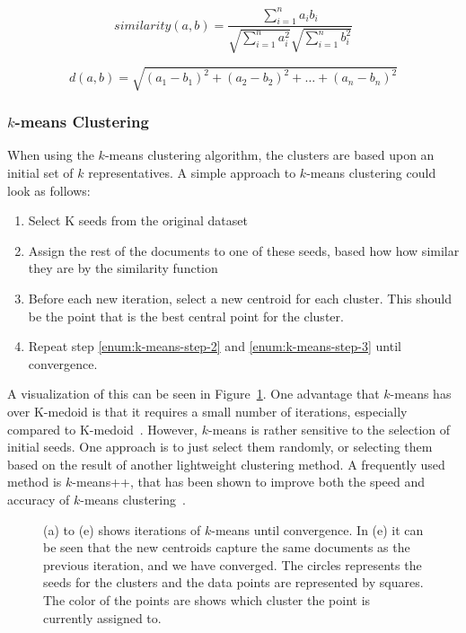 \begin{equation}\label{eq:cosine}
    similarity(a, b) = \frac{\sum_{i=1}^n a_i b_i}{\sqrt{\sum_{i=1}^n a_i^2}\sqrt{\sum_{i=1}^n b_i^2}}
\end{equation}

\begin{equation}\label{eq:euclidean}
    d(a, b) = \sqrt{(a_1 - b_1)^2 + (a_2 - b_2)^2 + \hdots + (a_n - b_n)^2}
\end{equation}

\subsubsection{$k$-means Clustering}\label{sec:k-mean}

When using the $k$-means clustering algorithm, the clusters are based upon an initial set of $k$ representatives.
A simple approach to $k$-means clustering could look as follows:

\begin{enumerate}
    \item Select K seeds from the original dataset
    \item \label{enum:k-means-step-2} Assign the rest of the documents to one of these seeds, based how how similar they are by the similarity function
    \item \label{enum:k-means-step-3} Before each new iteration, select a new centroid for each cluster. This should be the point that is the best central point for the cluster.
    \item Repeat step \ref{enum:k-means-step-2} and \ref{enum:k-means-step-3} until convergence.
\end{enumerate}

A visualization of this can be seen in Figure~\ref{fig:kmeans-iterations}.
One advantage that $k$-means has over K-medoid is that it requires a small number of iterations, especially compared to K-medoid~\cite{aggarwal2012survey, schutze1997projections}.
However, $k$-means is rather sensitive to the selection of initial seeds.
One approach is to just select them randomly, or selecting them based on the result of another lightweight clustering method.
A frequently used method is $k$-means++, that has been shown to improve both the speed and accuracy of $k$-means clustering~\cite{arthur2007k}.

\begin{figure}
    \centering
    \quad
    \caption{(a) to (e) shows iterations of $k$-means until convergence.
        In (e) it can be seen that the new centroids capture the same documents as the previous iteration, and we have converged.
        The circles represents the seeds for the clusters and the data points are represented by squares.
        The color of the points are shows which cluster the point is currently assigned to.}
    \label{fig:kmeans-iterations}
\end{figure}

